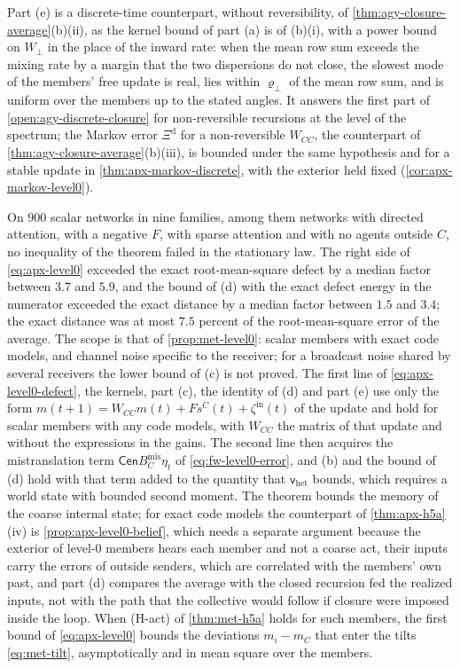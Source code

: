 Part (e) is a discrete-time counterpart, without reversibility, of \cref{thm:agy-closure-average}(b)(ii), as the kernel bound of part (a) is of (b)(i), with a power bound on $W_\perp$ in the place of the inward rate: when the mean row sum exceeds the mixing rate by a margin that the two dispersions do not close, the slowest mode of the members' free update is real, lies within $\varrho_\perp$ of the mean row sum, and is uniform over the members up to the stated angles. It answers the first part of \cref{open:agy-discrete-closure} for non-reversible recursions at the level of the spectrum; the Markov error $\Xi^{\mathrm d}$ for a non-reversible $W_{CC}$, the counterpart of \cref{thm:agy-closure-average}(b)(iii), is bounded under the same hypothesis and for a stable update in \cref{thm:apx-markov-discrete}, with the exterior held fixed (\cref{cor:apx-markov-level0}).

On $900$ scalar networks in nine families, among them networks with directed attention, with a negative $F$, with sparse attention and with no agents outside $C$, no inequality of the theorem failed in the stationary law. The right side of \eqref{eq:apx-level0} exceeded the exact root-mean-square defect by a median factor between $3.7$ and $5.9$, and the bound of (d) with the exact defect energy in the numerator exceeded the exact distance by a median factor between $1.5$ and $3.4$; the exact distance was at most $7.5$ percent of the root-mean-square error of the average. The scope is that of \cref{prop:met-level0}: scalar members with exact code models, and channel noise specific to the receiver; for a broadcast noise shared by several receivers the lower bound of (c) is not proved. The first line of \eqref{eq:apx-level0-defect}, the kernels, part (c), the identity of (d) and part (e) use only the form $m(t+1)=W_{CC}m(t)+Fs^C(t)+\zeta^{\mathrm{in}}(t)$ of the update and hold for scalar members with any code models, with $W_{CC}$ the matrix of that update and without the expressions in the gains. The second line then acquires the mistranslation term $\mathsf{Cen}B^{\mathrm{mis}}_C\eta_t$ of \eqref{eq:fw-level0-error}, and (b) and the bound of (d) hold with that term added to the quantity that $\mathsf v_{\mathrm{het}}$ bounds, which requires a world state with bounded second moment. The theorem bounds the memory of the coarse internal state; for exact code models the counterpart of \cref{thm:apx-h5a}(iv) is \cref{prop:apx-level0-belief}, which needs a separate argument because the exterior of level-0 members hears each member and not a coarse act, their inputs carry the errors of outside senders, which are correlated with the members' own past, and part (d) compares the average with the closed recursion fed the realized inputs, not with the path that the collective would follow if closure were imposed inside the loop. When (H-act) of \cref{thm:met-h5a} holds for such members, the first bound of \eqref{eq:apx-level0} bounds the deviations $m_i-m_C$ that enter the tilts \eqref{eq:met-tilt}, asymptotically and in mean square over the members.


